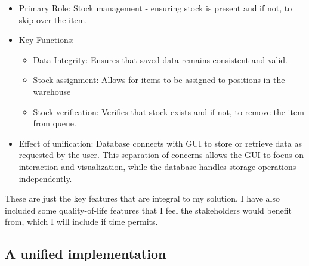\begin{itemize}
    \item Primary Role: Stock management - ensuring stock is present and if not, to skip over the item.
    \item Key Functions:
        \begin{itemize}
            \item Data Integrity: Ensures that saved data remains consistent and valid.
            \item Stock assignment: Allows for items to be assigned to positions in the warehouse
            \item Stock verification: Verifies that stock exists and if not, to remove the item from queue.
        \end{itemize}
    \item Effect of unification: \newline
        Database connects with GUI to store or retrieve data as requested by the user. This separation of concerns allows the GUI to focus on interaction and visualization, while the database handles storage operations independently.
\end{itemize}

These are just the key features that are integral to my solution. I have also included some quality-of-life features that I feel the stakeholders would benefit from, which I will include if time permits.

\newpage

\subsection{A unified implementation}

